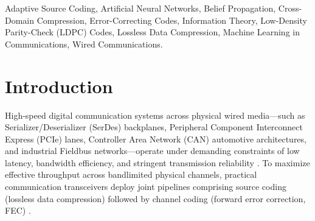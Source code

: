 \documentclass[conference]{IEEEtran}
\begin{document}
\begin{IEEEkeywords}
Adaptive Source Coding, Artificial Neural Networks, Belief Propagation, Cross-Domain Compression, Error-Correcting Codes, Information Theory, Low-Density Parity-Check (LDPC) Codes, Lossless Data Compression, Machine Learning in Communications, Wired Communications.
\end{IEEEkeywords}

\section{Introduction}
\label{sec:introduction}

High-speed digital communication systems across physical wired media---such as Serializer/Deserializer (SerDes) backplanes, Peripheral Component Interconnect Express (PCIe) lanes, Controller Area Network (CAN) automotive architectures, and industrial Fieldbus networks---operate under demanding constraints of low latency, bandwidth efficiency, and stringent transmission reliability \cite{shannon1948,proakis2008}. To maximize effective throughput across bandlimited physical channels, practical communication transceivers deploy joint pipelines comprising source coding (lossless data compression) followed by channel coding (forward error correction, FEC) \cite{gallager1968,mackay2003}.
\end{document}
